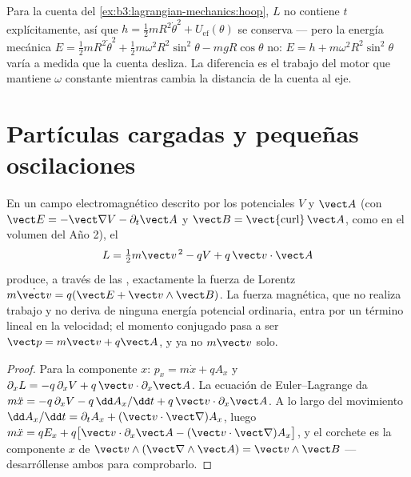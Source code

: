 \begin{example}\label{ex:b3:lagrangian-mechanics:hoop-energy}
Para la cuenta del \cref{ex:b3:lagrangian-mechanics:hoop}, $L$ no contiene
$t$ explícitamente, así que $h = \tfrac12 mR^2\dot\theta^2 + U_{\text{ef}}
(\theta)$ se conserva --- pero la energía mecánica $E = \tfrac12
mR^2\dot\theta^2 + \tfrac12 m\omega^2R^2\sin^2\theta - mgR\cos\theta$
no: $E = h + m\omega^2R^2\sin^2\theta$ varía a medida que la cuenta desliza.
La diferencia es el trabajo del motor que mantiene $\omega$ constante
mientras cambia la distancia de la cuenta al eje.
\end{example}

\section{Partículas cargadas y pequeñas oscilaciones}

\begin{proposition}\label{prop:b3:lagrangian-mechanics:charge}
En un campo electromagnético descrito por los potenciales $V$ y
$\vect A$ (con $\vect E = -\vect\nabla V - \partial_t\vect A$ y
$\vect B = \operatorname{\vect{curl}}\vect A$, como en el volumen del
Año 2), el 
\[
L = \tfrac12 m\vect v^{\,2} - qV + q\,\vect v\cdot\vect A
\]
produce, a través de las , exactamente la
fuerza de Lorentz $m\dot{\vect v} = q(\vect E + \vect v\wedge\vect B)$. La
fuerza magnética, que no realiza trabajo y no deriva de ninguna energía
potencial ordinaria, entra por un término lineal en la velocidad; el momento
conjugado pasa a ser $\vect p = m\vect v + q\vect A$, y ya no $m\vect v$
solo.
\end{proposition}

\begin{proof}
Para la componente $x$: $p_x = m\dot x + qA_x$ y
$\partial_xL = -q\,\partial_xV + q\,\vect v\cdot\partial_x\vect A$. La
ecuación de Euler--Lagrange da $m\ddot x = -q\,\partial_xV -
q\,\dd A_x/\dd t + q\,\vect v\cdot\partial_x\vect A$. A lo largo del
movimiento $\dd A_x/\dd t = \partial_tA_x + (\vect v\cdot\vect\nabla)A_x$,
luego $m\ddot x = qE_x + q\big[\vect v\cdot\partial_x\vect A - (\vect v\cdot
\vect\nabla)A_x\big]$, y el corchete es la componente $x$ de $\vect
v\wedge(\vect\nabla\wedge\vect A) = \vect v\wedge\vect B$ --- desarróllense
ambos para comprobarlo.
\end{proof}

